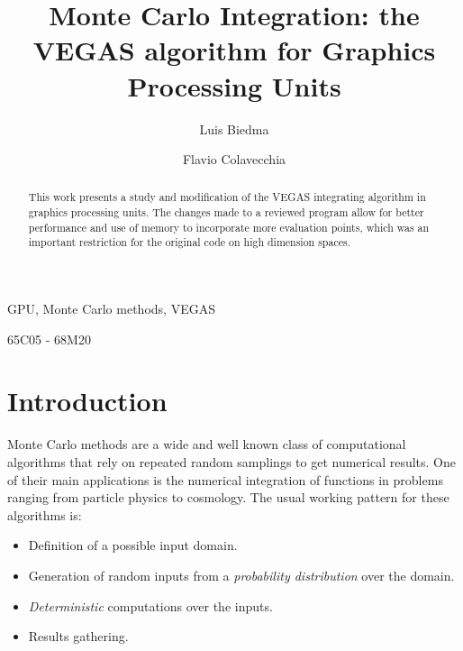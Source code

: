 \documentclass[english]{maciarticle}
\begin{document}
\title{Monte Carlo Integration: the VEGAS algorithm for Graphics Processing Units}

\author[$a$]{Luis Biedma}
\author[$b$]{Flavio Colavecchia}
%


 \maketitle


\begin{abstract}
This work presents a study and modification of the VEGAS integrating algorithm in graphics processing units. The changes made to a reviewed program allow for better performance and use of memory to incorporate more evaluation points, which was an important restriction for the original code on high dimension spaces.
\end{abstract}
\begin{keywords}
GPU, Monte Carlo methods, VEGAS
\end{keywords}
\begin{mathsubclass}
65C05 - 68M20
\end{mathsubclass}


{\thispagestyle{empty}} %



\section{Introduction}

Monte Carlo methods are a wide and well known class of computational algorithms that rely on repeated random samplings to get numerical results. One of their main applications is the numerical integration of functions in problems ranging from particle physics\cite{lhc} to cosmology\cite{cosmo}. The usual working pattern for these algorithms is:

\begin{itemize}
	\item Definition of a possible input domain.
	\item Generation of random inputs from a \textit{probability distribution} over the domain.
	\item \textit{Deterministic} computations over the inputs.
	\item Results gathering.
\end{itemize}
\end{document}

